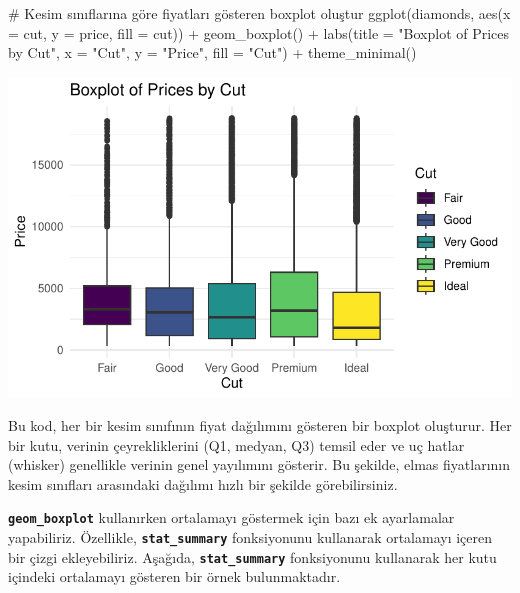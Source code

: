 \documentclass[
  letterpaper,
  DIV=11,
  numbers=noendperiod]{scrreprt}
\newenvironment{Shaded}{\begin{snugshade}}{\end{snugshade}}
\newcommand{\AttributeTok}[1]{\textcolor[rgb]{0.40,0.45,0.13}{#1}}
\newcommand{\CommentTok}[1]{\textcolor[rgb]{0.37,0.37,0.37}{#1}}
\newcommand{\FunctionTok}[1]{\textcolor[rgb]{0.28,0.35,0.67}{#1}}
\newcommand{\NormalTok}[1]{\textcolor[rgb]{0.00,0.23,0.31}{#1}}
\newcommand{\SpecialCharTok}[1]{\textcolor[rgb]{0.37,0.37,0.37}{#1}}
\newcommand{\StringTok}[1]{\textcolor[rgb]{0.13,0.47,0.30}{#1}}
\begin{document}
\begin{Shaded}
\begin{Highlighting}[]
\CommentTok{\# Kesim sınıflarına göre fiyatları gösteren boxplot oluştur}
\FunctionTok{ggplot}\NormalTok{(diamonds, }\FunctionTok{aes}\NormalTok{(}\AttributeTok{x =}\NormalTok{ cut, }\AttributeTok{y =}\NormalTok{ price, }\AttributeTok{fill =}\NormalTok{ cut)) }\SpecialCharTok{+}
  \FunctionTok{geom\_boxplot}\NormalTok{() }\SpecialCharTok{+}
  \FunctionTok{labs}\NormalTok{(}\AttributeTok{title =} \StringTok{"Boxplot of Prices by Cut"}\NormalTok{,}
       \AttributeTok{x =} \StringTok{"Cut"}\NormalTok{,}
       \AttributeTok{y =} \StringTok{"Price"}\NormalTok{,}
       \AttributeTok{fill =} \StringTok{"Cut"}\NormalTok{) }\SpecialCharTok{+}
  \FunctionTok{theme\_minimal}\NormalTok{()}
\end{Highlighting}
\end{Shaded}

\includegraphics{ggplot2_files/figure-pdf/unnamed-chunk-7-1.pdf}

Bu kod, her bir kesim sınıfının fiyat dağılımını gösteren bir boxplot
oluşturur. Her bir kutu, verinin çeyrekliklerini (Q1, medyan, Q3) temsil
eder ve uç hatlar (whisker) genellikle verinin genel yayılımını
gösterir. Bu şekilde, elmas fiyatlarının kesim sınıfları arasındaki
dağılımı hızlı bir şekilde görebilirsiniz.

\textbf{\texttt{geom\_boxplot}} kullanırken ortalamayı göstermek için
bazı ek ayarlamalar yapabiliriz. Özellikle,
\textbf{\texttt{stat\_summary}} fonksiyonunu kullanarak ortalamayı
içeren bir çizgi ekleyebiliriz. Aşağıda, \textbf{\texttt{stat\_summary}}
fonksiyonunu kullanarak her kutu içindeki ortalamayı gösteren bir örnek
bulunmaktadır.
\end{document}
